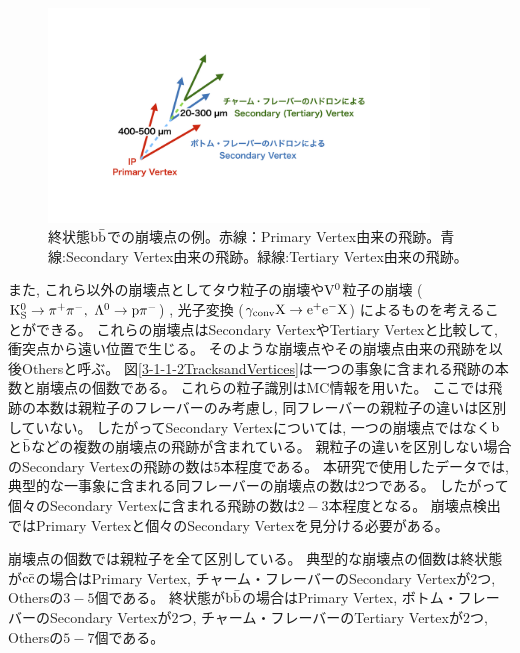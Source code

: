 \begin{figure}[htbp]
 \centering
 \includegraphics[trim = 200 200 200 200, width=0.9\textwidth, clip]{Figure/3Networks/3-1-1-1FinalStateBB.png}
 \caption[終状態$\rm b\bar{b}$での崩壊点の例]{終状態$\rm b\bar{b}$での崩壊点の例。赤線：Primary Vertex由来の飛跡。青線:Secondary Vertex由来の飛跡。緑線:Tertiary Vertex由来の飛跡。}
 \label{3-1-1-1FinalStateBB}
\end{figure}

また, これら以外の崩壊点としてタウ粒子の崩壊や$\rm V^0$粒子の崩壊 ($\rm K^0_S \to \pi^+\pi^-,\ \Lambda^0 \to p \pi^-$) , 光子変換 ($\rm \gamma_{conv} X \to e^+e^-X$) によるものを考えることができる。
これらの崩壊点はSecondary VertexやTertiary Vertexと比較して, 衝突点から遠い位置で生じる。
そのような崩壊点やその崩壊点由来の飛跡を以後Othersと呼ぶ。
図\ref{3-1-1-2TracksandVertices}は一つの事象に含まれる飛跡の本数と崩壊点の個数である。
これらの粒子識別はMC情報を用いた。
ここでは飛跡の本数は親粒子のフレーバーのみ考慮し, 同フレーバーの親粒子の違いは区別していない。
したがってSecondary Vertexについては, 一つの崩壊点ではなく$\rm b$と$\rm \bar{b}$などの複数の崩壊点の飛跡が含まれている。
親粒子の違いを区別しない場合のSecondary Vertexの飛跡の数は$5$本程度である。
本研究で使用したデータでは, 典型的な一事象に含まれる同フレーバーの崩壊点の数は$2$つである。
したがって個々のSecondary Vertexに含まれる飛跡の数は$2-3$本程度となる。
崩壊点検出ではPrimary Vertexと個々のSecondary Vertexを見分ける必要がある。

崩壊点の個数では親粒子を全て区別している。
典型的な崩壊点の個数は終状態が$\rm c\bar{c}$の場合はPrimary Vertex, チャーム・フレーバーのSecondary Vertexが$2$つ, Othersの$3-5$個である。
終状態が$\rm b\bar{b}$の場合はPrimary Vertex, ボトム・フレーバーのSecondary Vertexが$2$つ, チャーム・フレーバーのTertiary Vertexが$2$つ, Othersの$5-7$個である。

